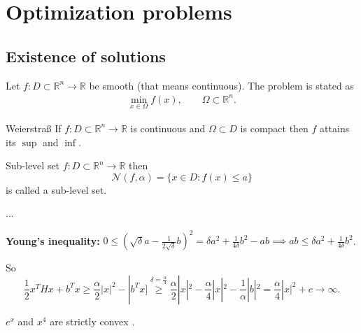 \documentclass[a4paper, landscape,twocolumn,fontsize=9pt]{scrartcl}
\begin{document}
\section{Optimization problems}
\subsection{Existence of solutions}

Let $f: D \subset \mathbb R^n \to \mathbb R$ be smooth (that means continuous). The problem is stated as
\begin{align*}
	\min_{x\in \Omega} f(x), \qquad \Omega \subset \mathbb R^n.
\end{align*}

\begin{theorem}{Weierstraß}{}
If $f: D \subset \mathbb R^n \to \mathbb R$ is continuous and $\Omega \subset D$ is compact then $f$ attains its $\sup$ and $\inf$.
\end{theorem}

\begin{definition}{Sub-level set}{}
$f: D \subset \mathbb R^n \to \mathbb R$ then
\[
	\mathcal N(f, \alpha) = \{ x \in D : f(x) \leq a \}
\]
is called a sub-level set.
\end{definition}

...

\textbf{Young's inequality:} $0 \leq (\sqrt{\delta} a - \frac{1}{2\sqrt \delta}b)^2 = \delta a^2 + \frac{1}{4\delta}b^2 - ab \implies ab \leq \delta a^2 + \frac{1}{4\delta}b^2$.

So
\[
	\frac{1}{2} x^THx + b^Tx \geq \frac{\alpha}{2}|x|^2 - |b^Tx] \overset{\delta = \frac{\alpha}{4}}{\geq} \frac{\alpha}{2}|x|^2 - \frac{\alpha}{4}|x|^2 - \frac{1}{\alpha}|b|^2 = \frac{\alpha}{4}|x|^2 + c \to \infty.
\]

\begin{example}{}{}
$e^x$ and $x^4$ are strictly convex .
\end{example}
\end{document}
